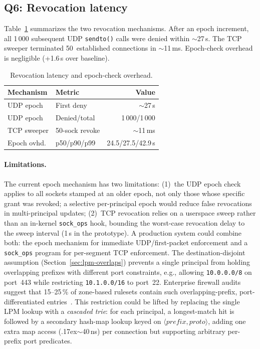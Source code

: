 \documentclass[sigconf]{acmart}
\begin{document}
\subsection{Q6: Revocation latency}
\label{sec:appendix:q6}

Table~\ref{tab:revocation} summarizes the two revocation
mechanisms.  After an epoch increment, all 1\,000 subsequent
UDP \texttt{sendto()} calls were denied within
$\sim$27\,\textmu{}s.  The TCP sweeper terminated 50~established
connections in $\sim$11\,ms.  Epoch-check overhead is negligible
(+1.6\,\textmu{}s over baseline).

\begin{table}[t]
\centering
\caption{Revocation latency and epoch-check overhead.}
\label{tab:revocation}
\small
\begin{tabular}{llr}
\toprule
Mechanism & Metric & Value \\
\midrule
UDP epoch     & First deny     & $\sim$27\,\textmu{}s \\
UDP epoch     & Denied/total   & 1\,000/1\,000 \\
TCP sweeper   & 50-sock revoke & $\sim$11\,ms \\
Epoch ovhd.   & p50/p90/p99    & 24.5/27.5/42.9\,\textmu{}s \\
\bottomrule
\end{tabular}
\end{table}

\paragraph{Limitations.}
The current epoch mechanism has two limitations:
(1)~the UDP epoch check applies to all sockets stamped at an
older epoch, not only those whose specific grant was revoked; a
selective per-principal epoch would reduce false revocations in
multi-principal updates;
(2)~TCP revocation relies on a userspace sweep rather than an
in-kernel \texttt{sock\_ops} hook, bounding the worst-case
revocation delay to the sweep interval (1\,s in the prototype).
A production system could combine both: the epoch mechanism for
immediate UDP/first-packet enforcement and a \texttt{sock\_ops}
program for per-segment TCP enforcement.
The destination-disjoint assumption (Section~\ref{sec:lpm-overlaps})
prevents a single principal from holding overlapping prefixes with
different port constraints, e.g., allowing \texttt{10.0.0.0/8}
on port~443 while restricting \texttt{10.1.0.0/16} to port~22.
Enterprise firewall audits suggest that 15--25\,\% of zone-based
rulesets contain such overlapping-prefix, port-differentiated
entries~\cite{wool2004quantitative,wool2010trends}.
This restriction could be lifted by replacing the single LPM
lookup with a \emph{cascaded trie}: for each principal, a
longest-match hit is followed by a secondary hash-map lookup
keyed on $\langle\mathit{prefix},\mathit{proto}\rangle$, adding
one extra map access ({\raise.17ex\hbox{$\scriptstyle\sim$}}40\,ns)
per connection but supporting arbitrary per-prefix port
predicates.
\end{document}
